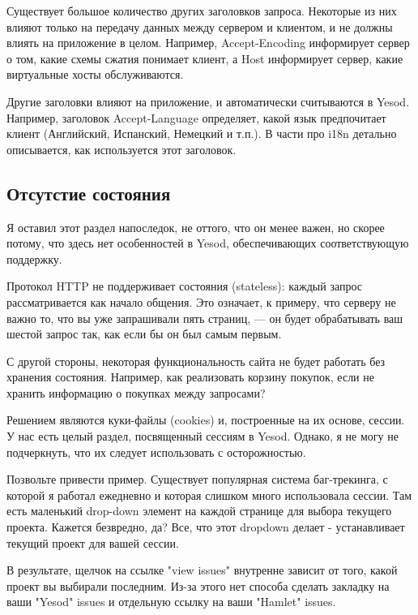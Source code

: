 Существует большое количество других заголовков запроса. Некоторые из них влияют только на передачу данных между сервером и клиентом, и не должны влиять на приложение в целом. Например, Accept-Encoding информирует сервер о том, какие схемы сжатия понимает клиент, а Host информирует сервер, какие виртуальные хосты обслуживаются.

Другие заголовки влияют на приложение, и автоматически считываются в Yesod. Например, заголовок Accept-Language определяет, какой язык предпочитает клиент (Английский, Испанский, Немецкий и т.п.). В части про i18n детально описывается, как используется этот заголовок.

\subsection{Отсутстие состояния}

Я оставил этот раздел напоследок, не оттого, что он менее важен, но скорее потому, что здесь нет особенностей в Yesod, обеспечивающих соответствующую поддержку.

Протокол HTTP не поддерживает состояния (stateless): каждый запрос рассматривается как начало общения. Это означает, к примеру, что серверу не важно то, что вы уже запрашивали пять страниц, --- он будет обрабатывать ваш шестой запрос так, как если бы он был самым первым.

С другой стороны, некоторая функциональность сайта не будет работать без хранения состояния. Например, как реализовать корзину покупок, если не хранить информацию о покупках между запросами?

Решением являются куки-файлы (cookies) и, построенные на их основе, сессии. У нас есть целый раздел, посвященный сессиям в Yesod. Однако, я не могу не подчеркнуть, что их следует использовать с осторожностью.

Позвольте привести пример. Существует популярная система баг-трекинга, с которой я работал ежедневно и которая слишком много использовала сессии. Там есть маленький drop-down элемент на каждой странице для выбора текущего проекта. Кажется безвредно, да? Все, что этот dropdown делает - устанавливает текущий проект для вашей сессии.

В результате, щелчок на ссылке "view issues" внутренне зависит от того, какой проект вы выбирали последним. Из-за этого нет способа сделать закладку на ваши "Yesod" issues и отдельную ссылку на ваши "Hamlet" issues.

